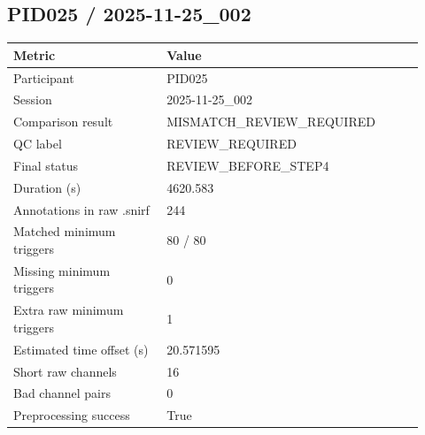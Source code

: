 \subsection*{PID025 / 2025-11-25\_002}
\begin{tabular}{p{0.34\linewidth}p{0.58\linewidth}}
\toprule
Metric & Value\\
\midrule
Participant & PID025\\
Session & 2025-11-25\_002\\
Comparison result & MISMATCH\_REVIEW\_REQUIRED\\
QC label & REVIEW\_REQUIRED\\
Final status & REVIEW\_BEFORE\_STEP4\\
Duration (s) & 4620.583\\
Annotations in raw .snirf & 244\\
Matched minimum triggers & 80 / 80\\
Missing minimum triggers & 0\\
Extra raw minimum triggers & 1\\
Estimated time offset (s) & 20.571595\\
Short raw channels & 16\\
Bad channel pairs & 0\\
Preprocessing success & True\\
\bottomrule
\end{tabular}
